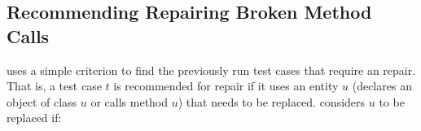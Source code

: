 %
%
%
%
%
%
%

\subsection{Recommending Repairing Broken Method Calls}
{\tool} uses a simple criterion to find the previously run test cases
that require an repair. That is, a test case $t$ is recommended for repair if it uses an entity $u$ (\eg declares an object of class $u$ or calls method $u$) that needs to be replaced. {\tool} considers $u$
to be replaced if:

